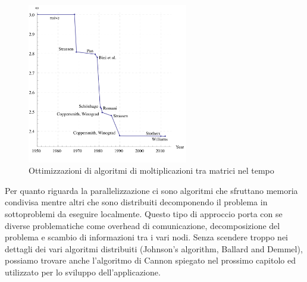 \begin{figure}[htbp]
    \begin{center}
        \includegraphics[width=7cm]{immagini/matrix_algorithms.png}
    \end{center}
    \caption{Ottimizzazioni di algoritmi di moltiplicazioni tra matrici nel tempo}
    \label{fig:matrix_algo}
\end{figure}

Per quanto riguarda la parallelizzazione ci sono algoritmi che sfruttano memoria condivisa mentre altri che sono distribuiti decomponendo il problema in sottoproblemi da eseguire localmente. Questo tipo di approccio porta con se diverse problematiche come overhead di comunicazione, decomposizione del problema e scambio di informazioni tra i vari nodi.
Senza scendere troppo nei dettagli dei vari algoritmi distribuiti (Johnson's algorithm, Ballard and Demmel), possiamo trovare anche l'algoritmo di Cannon spiegato nel prossimo capitolo ed utilizzato per lo sviluppo dell'applicazione.

